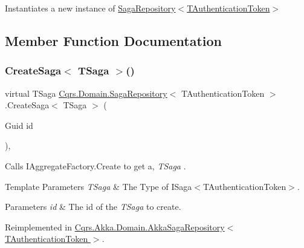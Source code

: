 Instantiates a new instance of \hyperlink{classCqrs_1_1Domain_1_1SagaRepository_ab444c7f3ace1ee0350d9f396345c395d_ab444c7f3ace1ee0350d9f396345c395d}{Saga\+Repository$<$\+T\+Authentication\+Token$>$} 



\subsection{Member Function Documentation}
\mbox{\label{classCqrs_1_1Domain_1_1SagaRepository_acb23e0bd3e5655547a13b4ad2b06e548_acb23e0bd3e5655547a13b4ad2b06e548}} 
\subsubsection{\texorpdfstring{Create\+Saga$<$ T\+Saga $>$()}{CreateSaga< TSaga >()}}
{\footnotesize\ttfamily virtual T\+Saga \hyperlink{classCqrs_1_1Domain_1_1SagaRepository}{Cqrs.\+Domain.\+Saga\+Repository}$<$ T\+Authentication\+Token $>$.Create\+Saga$<$ T\+Saga $>$ (\begin{DoxyParamCaption}\item[{Guid}]{id }\end{DoxyParamCaption})\hspace{0.3cm}{\ttfamily [protected]}, {\ttfamily [virtual]}}



Calls I\+Aggregate\+Factory.\+Create to get a, {\itshape T\+Saga} . 


\begin{DoxyTemplParams}{Template Parameters}
{\em T\+Saga} & The Type of I\+Saga$<$\+T\+Authentication\+Token$>$.\\
\hline
\end{DoxyTemplParams}

\begin{DoxyParams}{Parameters}
{\em id} & The id of the {\itshape T\+Saga}  to create.\\
\hline
\end{DoxyParams}


Reimplemented in \hyperlink{classCqrs_1_1Akka_1_1Domain_1_1AkkaSagaRepository_a2c7263d0e58d2b31149ec685d5be934a_a2c7263d0e58d2b31149ec685d5be934a}{Cqrs.\+Akka.\+Domain.\+Akka\+Saga\+Repository$<$ T\+Authentication\+Token $>$}.

